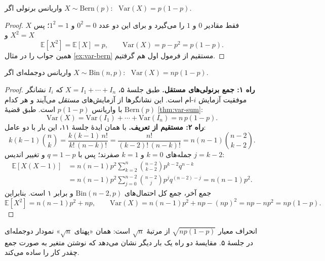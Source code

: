 \begin{proposition}[label=prop:V-bern]{واریانس برنولی}
  اگر $X\sim\mathrm{Bern}(p)$: \ $\mathrm{Var}(X)=p(1-p)$.
\end{proposition}
\begin{proof}
  $X$ فقط مقادیر $0$ و $1$ را می‌گیرد و برای این دو عدد $0^2=0$ و $1^2=1$؛ پس $X^2=X$ و
  \[ \mathbb E[X^2]=\mathbb E[X]=p,\qquad \mathrm{Var}(X)=p-p^2=p(1-p). \]
  همین جواب را در مثال \ref{ex:var-bern} مستقیم از فرمول اول هم گرفتیم.
\end{proof}

\begin{proposition}[label=prop:V-bin]{واریانس دوجمله‌ای}
  اگر $X\sim\mathrm{Bin}(n,p)$: \ $\mathrm{Var}(X)=np(1-p)$.
\end{proposition}
\begin{proof}
  \textbf{راه ۱: جمع برنولی‌های مستقل.} طبق جلسهٔ ۵، $X=I_1+\cdots+I_n$ که $I_i$ نشانگر موفقیت آزمایش $i$-ام است. این نشانگرها از آزمایش‌های \emph{مستقل} می‌آیند و هر کدام $\mathrm{Bern}(p)$ با واریانس $p(1-p)$ است. طبق قضیهٔ \ref{thm:var-sum}:
  \[ \mathrm{Var}(X)=\mathrm{Var}(I_1)+\cdots+\mathrm{Var}(I_n)=n\,p(1-p). \]
  \textbf{راه ۲: مستقیم از تعریف.} با همان ایدهٔ جلسهٔ ۱۱، این بار با دو عامل:
  \[ k(k-1)\binom nk=\frac{k(k-1)\,n!}{k!\,(n-k)!}=\frac{n!}{(k-2)!\,(n-k)!}=n(n-1)\binom{n-2}{k-2}. \]
  جمله‌های $k=0$ و $k=1$ صفرند؛ پس با $q=1-p$ و تغییر اندیس $j=k-2$:
  \begin{align*}
    \mathbb E[X(X-1)] & =n(n-1)p^2\sum_{k=2}^{n}\binom{n-2}{k-2}p^{k-2}q^{n-k}              \\
                      & =n(n-1)p^2\sum_{j=0}^{n-2}\binom{n-2}{j}p^{j}q^{(n-2)-j}=n(n-1)p^2.
  \end{align*}
  جمع آخر، جمع کل احتمال‌های $\mathrm{Bin}(n-2,p)$ و برابر ۱ است. بنابراین
  \[ \mathbb E[X^2]=n(n-1)p^2+np,\qquad \mathrm{Var}(X)=n(n-1)p^2+np-(np)^2=np-np^2=np(1-p). \]
\end{proof}
انحراف معیار $\sqrt{np(1-p)}$ از مرتبهٔ $\sqrt n$ است: همان «پهنای $\sqrt n$» نمودار دوجمله‌ای در جلسهٔ ۵. مقایسهٔ دو راه یک بار دیگر نشان می‌دهد که نوشتن متغیر به صورت جمع چقدر کار را ساده می‌کند.

